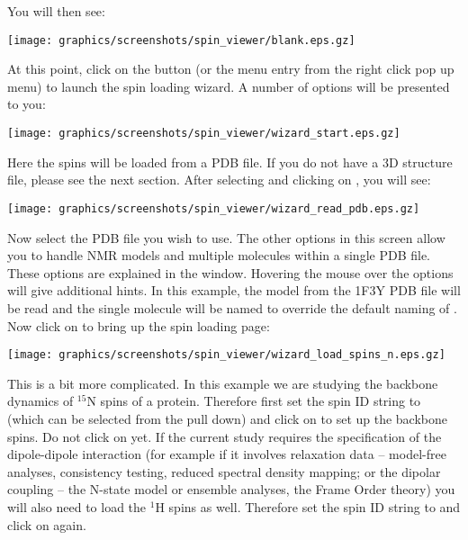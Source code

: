 You will then see:

\begin{minipage}[h]{\linewidth}
\centerline{\texttt{[image: graphics/screenshots/spin\_viewer/blank.eps.gz]}}
\label{figure: spin viewer blank}
\end{minipage}

At this point, click on the  button (or the  menu entry from the right click pop up menu) to launch the spin loading wizard.  A number of options will be presented to you: 

\begin{minipage}[h]{\linewidth}
\centerline{\texttt{[image: graphics/screenshots/spin\_viewer/wizard\_start.eps.gz]}}
\label{figure: spin viewer wizard start}
\end{minipage}

Here the spins will be loaded from a PDB file.  If you do not have a 3D structure file, please see the next section.  After selecting  and clicking on , you will see:

\begin{minipage}[h]{\linewidth}
\centerline{\texttt{[image: graphics/screenshots/spin\_viewer/wizard\_read\_pdb.eps.gz]}}
\end{minipage}

Now select the PDB file you wish to use.  The other options in this screen allow you to handle NMR models and multiple molecules within a single PDB file.  These options are explained in the window.  Hovering the mouse over the options will give additional hints.  In this example, the  model from the 1F3Y PDB file will be read and the single molecule will be named  to override the default naming of .  Now click on  to bring up the spin loading page:

\begin{minipage}[h]{\linewidth}
\centerline{\texttt{[image: graphics/screenshots/spin\_viewer/wizard\_load\_spins\_n.eps.gz]}}
\end{minipage}

This is a bit more complicated.  In this example we are studying the backbone dynamics of $^{15}$N spins of a protein.  Therefore first set the spin ID string to  (which can be selected from the pull down) and click on  to set up the backbone spins.  Do not click on  yet.  If the current study requires the specification of the dipole-dipole interaction (for example if it involves relaxation data -- model-free analyses, consistency testing, reduced spectral density mapping; or the dipolar coupling -- the N-state model or ensemble analyses, the Frame Order theory) you will also need to load the $^1$H spins as well.  Therefore set the spin ID string to  and click on  again.



